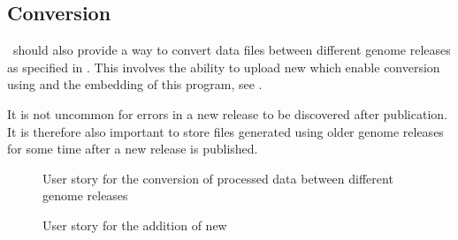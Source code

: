 

\subsection{Conversion}
\appName\ should also provide a way to convert  data files between different genome releases as specified in . This involves the ability to upload new  which enable conversion using  and the embedding of this program, see .

It is not uncommon for errors in a new release to be discovered after publication. It is therefore also important to store files generated using older genome releases for some time after a new release is published.

\begin{figure}[h!]
\caption{User story for the conversion of processed data between different genome releases}
\label{fig:target_genome}
\end{figure}

\begin{figure}[h!]
\caption{User story for the addition of new }
\label{fig:target_chain}
\end{figure}
\FloatBarrier

